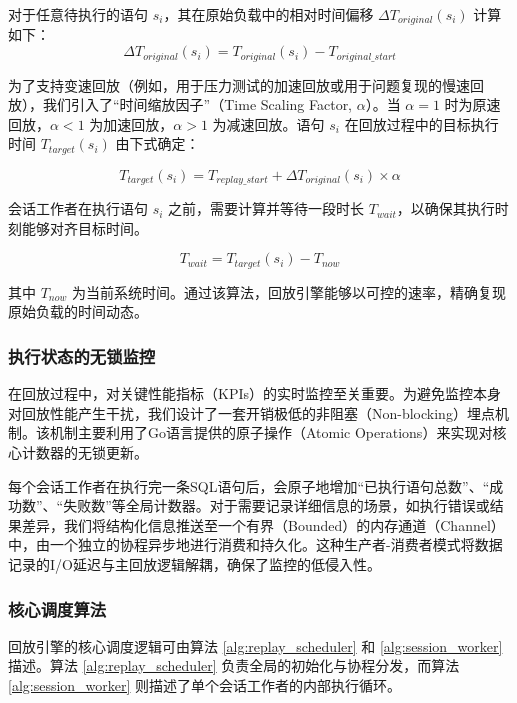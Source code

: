 对于任意待执行的语句 $s_i$，其在原始负载中的相对时间偏移 $\Delta T_{original}(s_i)$ 计算如下：
\begin{equation}
\Delta T_{original}(s_i) = T_{original}(s_i) - T_{original\_start}
\end{equation}

为了支持变速回放（例如，用于压力测试的加速回放或用于问题复现的慢速回放），我们引入了“时间缩放因子”（Time Scaling Factor, $\alpha$）。当 $\alpha=1$ 时为原速回放，$\alpha<1$ 为加速回放，$\alpha>1$ 为减速回放。语句 $s_i$ 在回放过程中的目标执行时间 $T_{target}(s_i)$ 由下式确定：

\begin{equation}
T_{target}(s_i) = T_{replay\_start} + \Delta T_{original}(s_i) \times \alpha
\end{equation}

会话工作者在执行语句 $s_i$ 之前，需要计算并等待一段时长 $T_{wait}$，以确保其执行时刻能够对齐目标时间。

\begin{equation}
\label{eq:wait_time}
T_{wait} = T_{target}(s_i) - T_{now}
\end{equation}

其中 $T_{now}$ 为当前系统时间。通过该算法，回放引擎能够以可控的速率，精确复现原始负载的时间动态。

\subsubsection{执行状态的无锁监控}
在回放过程中，对关键性能指标（KPIs）的实时监控至关重要。为避免监控本身对回放性能产生干扰，我们设计了一套开销极低的非阻塞（Non-blocking）埋点机制。该机制主要利用了Go语言提供的原子操作（Atomic Operations）来实现对核心计数器的无锁更新。

每个会话工作者在执行完一条SQL语句后，会原子地增加“已执行语句总数”、“成功数”、“失败数”等全局计数器。对于需要记录详细信息的场景，如执行错误或结果差异，我们将结构化信息推送至一个有界（Bounded）的内存通道（Channel）中，由一个独立的协程异步地进行消费和持久化。这种生产者-消费者模式将数据记录的I/O延迟与主回放逻辑解耦，确保了监控的低侵入性。

\subsubsection{核心调度算法}
回放引擎的核心调度逻辑可由算法 \ref{alg:replay_scheduler} 和 \ref{alg:session_worker} 描述。算法 \ref{alg:replay_scheduler} 负责全局的初始化与协程分发，而算法 \ref{alg:session_worker} 则描述了单个会话工作者的内部执行循环。

